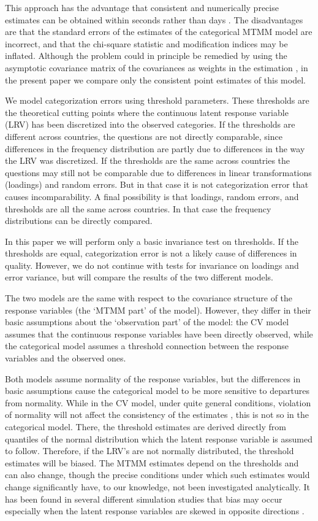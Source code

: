 \documentclass[a4paper,12pt]{article}
\begin{document}
This approach has the advantage that consistent and numerically precise estimates can be obtained within seconds rather than days \citep{muthen_latent_2002}. The disadvantages are that the standard errors of the estimates of the categorical MTMM model are incorrect, and that the chi-square statistic and modification indices may be inflated. Although the problem could in principle be remedied by using the asymptotic covariance matrix of the covariances as weights in the estimation \citep{joreskog_new_1990}, in the present paper we compare only the consistent point estimates of this model.


We model categorization errors using threshold parameters. These thresholds are the theoretical cutting points where the continuous latent response variable (LRV) has been discretized into the observed categories.  If the thresholds are different across countries, the questions are not directly comparable, since differences in the frequency distribution are partly due to differences in the way the LRV was discretized. If the thresholds are the same across countries the questions may still not be comparable due to differences in linear transformations (loadings) and random errors. But in that case it is not categorization error that causes incomparability. A final possibility is that loadings, random errors, and thresholds are all the same across countries. In that case the frequency distributions can be directly compared. 

In this paper we will perform only a basic invariance test on thresholds. If the thresholds are equal, categorization error is not a likely cause of differences in quality. However, we do not continue with tests for invariance on loadings and error variance, but will compare the results of the two different models.


The two models are the same with respect to the covariance structure of the response variables (the `MTMM part' of the model). However, they differ in their basic assumptions about the `observation part' of the model: the CV model assumes that the continuous response variables have been directly observed, while the categorical model assumes a threshold connection between the response variables and the observed ones. 

Both models assume normality of the response variables, but the differences in basic assumptions cause the categorical model to be more sensitive to departures from normality. While in the CV model, under quite general conditions, violation of normality will not affect the consistency of the estimates \citep{satorra_robustness_1990}, this is not so in the categorical model. There, the threshold estimates are derived directly from quantiles of the normal distribution which the latent response variable is assumed to follow. Therefore, if the LRV's are not normally distributed, the threshold estimates will be biased. The MTMM estimates depend on the thresholds and can also change, though the precise conditions under which such estimates would change significantly have, to our knowledge, not been investigated analytically. It has been found in several different simulation studies that bias may occur especially when the latent response variables are skewed in opposite directions \citep{coenders_structural_1996}. 
\end{document}
